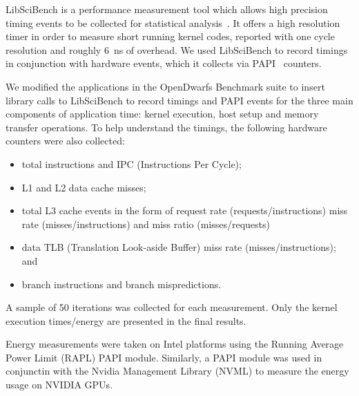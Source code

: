 \documentclass[../document.tex]{subfiles}
\begin{document}
\label{ssec:measurements}

LibSciBench is a performance measurement tool which allows high precision timing events to be collected for statistical analysis~\cite{hoefler2015scientific}.
It offers a high resolution timer in order to measure short running kernel codes, reported with one cycle resolution and roughly \SI{6}{\nano\second} of overhead.
We used LibSciBench to record timings in conjunction with hardware events, which it collects via PAPI~\cite{mucci1999papi} counters.

We modified the applications in the OpenDwarfs Benchmark suite to insert library calls to LibSciBench to record timings and PAPI events for the three main components of application time: kernel execution, host setup and memory transfer operations.
To help understand the timings, the following hardware counters were also collected:
\begin{itemize}
	\item total instructions and IPC (Instructions Per Cycle);
	\item L1 and L2 data cache misses;
	\item total L3 cache events in the form of request rate (requests/instructions) miss rate (misses/instructions) and miss ratio (misses/requests)
	\item data TLB (Translation Look-aside Buffer) miss rate (misses/instructions); and
	\item branch instructions and branch mispredictions.
\end{itemize}

A sample of 50 iterations was collected for each measurement.
Only the kernel execution times/energy are presented in the final results.

Energy measurements were taken on Intel platforms using the Running Average Power Limit (RAPL) PAPI module.
Similarly, a PAPI module was used in conjunctin with the Nvidia Management Library (NVML) to measure the energy usage on NVIDIA GPUs.
\end{document}
